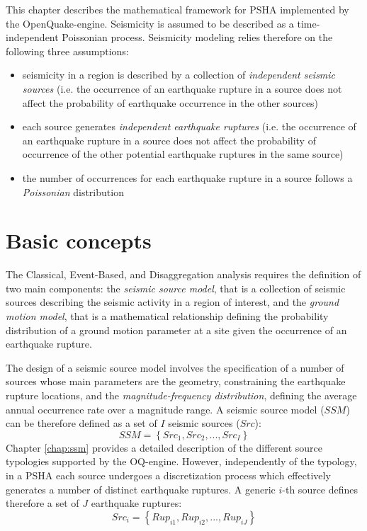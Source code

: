 This chapter describes the mathematical framework for PSHA implemented by the OpenQuake-engine.
Seismicity is assumed to be described as a time-independent Poissonian process. Seismicity modeling
relies therefore on the following three assumptions:
\begin{itemize}
	\item seismicity in a region is described by a collection of \textit{independent seismic sources}
	(i.e. the occurrence of an earthquake rupture in a source does not affect the probability of
	earthquake occurrence in the other sources)
	\item each source generates \textit{independent earthquake ruptures} (i.e. the occurrence of an
	earthquake rupture in a source does not affect the probability of occurrence of the other
	potential earthquake ruptures in the same source)
	\item the number of occurrences for each earthquake rupture in a source follows a \textit{Poissonian}
	distribution
\end{itemize}

\section{Basic concepts}
The Classical, Event-Based, and Disaggregation analysis requires the definition of two main components:
the \textit{seismic source model}, that is a collection of seismic sources describing the seismic activity in a
region of interest, and the \textit{ground motion model}, that is a mathematical relationship defining the
probability distribution of a ground motion parameter at a site given the occurrence of an earthquake
rupture.

The design of a seismic source model involves the specification of a number of sources whose main parameters
are the geometry, constraining the earthquake rupture locations, and the \textit{magnitude-frequency
distribution}, defining the average annual occurrence rate over a magnitude range. A seismic source model ($SSM$)
can be therefore defined as a set of $I$ seismic sources ($Src$):
\begin{equation}
SSM = \left\{Src_{1}, Src_{2}, ..., Src_{I}\right\}
\end{equation}
Chapter \ref{chap:ssm} provides
a detailed description of the different source typologies supported by the OQ-engine. However, independently
of the typology, in a PSHA each source undergoes a discretization process which effectively generates a
number of distinct earthquake ruptures. A generic $i$-th source defines therefore a set of $J$ earthquake ruptures:
\begin{equation}
Src_{i} = \left\{Rup_{i1}, Rup_{i2}, ..., Rup_{iJ}\right\}
\end{equation}

